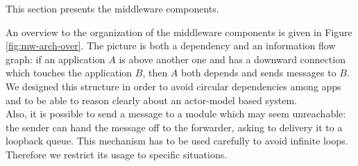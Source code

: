 This section presents the middleware components.

An overview to the organization of the middleware components is given in Figure
\ref{fig:mw-arch-over}. The picture is both a dependency and an information flow
graph: if an application $A$ is above another one and has a downward connection
which touches the application $B$, then $A$ both depends and sends messages to $B$.
We designed this structure in order to avoid circular dependencies among
apps and to be able to reason clearly about an actor-model based system.
\\

Also, it is possible to send a message to a module which may seem
unreachable: the sender can hand the message off to the
forwarder, asking to delivery it to a loopback queue.
This mechanism has to be used carefully to avoid infinite loops. Therefore
we restrict its usage to specific situations.

